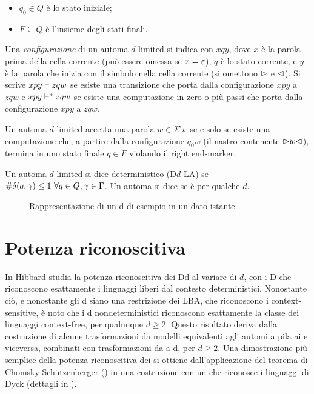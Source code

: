 \begin{defin}
\begin{itemize}
		\item $q_0\in Q$ è lo stato iniziale;
		\item $F\subseteq Q$ è l'insieme degli stati finali.
	\end{itemize}
	Una \emph{configurazione} di un automa $d$-limited si indica con $xqy$, dove $x$ è la parola prima della cella corrente (può essere omessa se $x=\varepsilon$), $q$ è lo stato corrente, e $y$ è la parola che inizia con il simbolo nella cella corrente (si omettono $\rhd$ e $\lhd$). Si scrive $xpy\vdash zqw$ se esiste una transizione che porta dalla configurazione $xpy$ a $zqw$ e $xpy\vdash^* zqw$ se esiste una computazione in zero o più passi che porta dalla configurazione $xpy$ a $zqw$.

	Un automa $d$-limited accetta una parola $w\in\Sigma\star$ se e solo se esiste una computazione che, a partire dalla configurazione $q_0w$ (il nastro contenente $\rhd w\lhd$), termina in uno stato finale $q\in F$ violando il right end-marker.

	Un automa $d$-limited si dice deterministico (D$d$-LA) se $\# \delta(q,\gamma)\leq 1 ~ \forall q\in Q,\gamma\in\Gamma$. Un automa si dice  se è  per qualche $d$.
\end{defin}

\begin{figure}
	\centering
	
	\caption{Rappresentazione di un \la d di esempio in un dato istante.}
\end{figure}



\section{Potenza riconoscitiva}
In \cite{Hibbard:67:CFdet} Hibbard studia la potenza riconoscitiva dei D\la d al variare di $d$, con i D che riconoscono esattamente i linguaggi liberi dal contesto deterministici. Nonostante ciò, e nonostante gli \la d siano una restrizione dei LBA, che riconoscono i context-sensitive, è noto che i \la d nondeterministici riconoscono esattamente la classe dei linguaggi context-free, per qualunque $d\geq2$. Questo risultato deriva dalla costruzione di alcune trasformazioni da modelli equivalenti agli automi a pila ai  e viceversa, combinati con trasformazioni da  a \la d, per $d\geq2$. Una dimostrazione più semplice della potenza riconoscitiva dei  si ottiene dall'applicazione del teorema di Chomsky-Schützenberger (\cite{Chomsky:63:algebraCF}) in una costruzione con un  che riconosce i linguaggi di Dyck (dettagli in \cite{Pighizzini:19:limited}).

